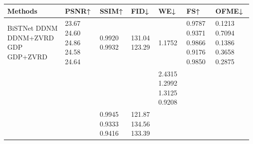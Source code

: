 \begin{tabular}{lllllll}
\toprule
Methods & PSNR↑ & SSIM↑ & FID↓ & WE↓ & FS↑ & OFME↓ \\
\midrule
BiSTNet DDNM DDNM+ZVRD GDP GDP+ZVRD & 23.67 24.60 24.86 24.58 24.64 & 0.9920 0.9932 & 131.04 123.29 & 1.1752 & 0.9787 0.9371 0.9866 0.9176 0.9850 & 0.1213 0.7094 0.1386 0.3658 0.2875 \\
 &  &  &  & 2.4315 1.2992 1.3125 0.9208 &  &  \\
 &  & 0.9945 0.9333 0.9416 & 121.87 134.56 133.39 &  &  &  \\
\bottomrule
\end{tabular}
